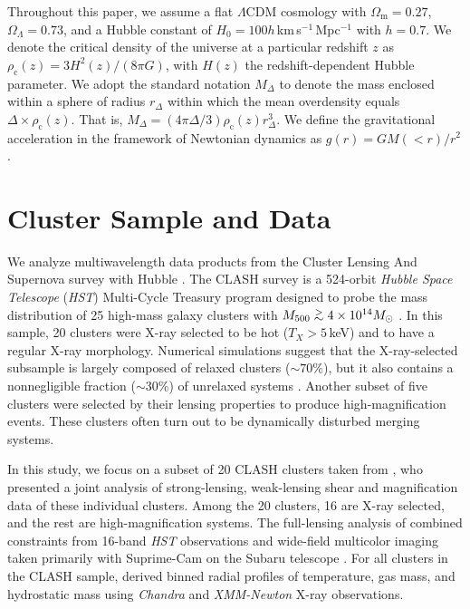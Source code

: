 \documentclass[a4paper,iop,twocolumn,twocolappendix,numberedappendix,appendixfloats]{emulateapj}
\newcommand{\percent}{\ensuremath{\%}}
\newcommand{\simgt}{\lower.5ex\hbox{$\; \buildrel > \over \sim \;$}}
\begin{document}
Throughout this paper, we assume a flat $\Lambda$CDM cosmology
with
$\Omega_\mathrm{m}=0.27$, $\Omega_\Lambda=0.73$, and a Hubble constant of
$H_0 = 100h$\,km\,s$^{-1}$\,Mpc$^{-1}$
with $h=0.7$.
We denote the critical density of the universe at a particular redshift
$z$ as $\rho_\mathrm{c}(z)=3H^2(z)/(8\pi G)$, with $H(z)$ the
redshift-dependent Hubble parameter.
We adopt the standard notation
$M_\Delta$
to denote the mass enclosed within a sphere of radius
$r_\Delta$
within which the mean overdensity equals
$\Delta \times \rho_\mathrm{c}(z)$. That is,
$M_\Delta=(4\pi\Delta/3)\rho_\mathrm{c}(z)r_\Delta^3$.
We define the gravitational acceleration
in the framework of Newtonian dynamics as $g(r)=GM(<r)/r^2$.

\section{Cluster Sample and Data}
\label{sec:data}

We analyze multiwavelength data products from the Cluster Lensing And
Supernova survey with Hubble \citep[CLASH;][]{Postman12}.
The CLASH survey is a 524-orbit {\em Hubble Space Telescope} ({\em HST})
Multi-Cycle Treasury program designed to probe the mass
distribution of 25 high-mass galaxy clusters with
$M_{500}\simgt 4\times 10^{14}M_\odot$ \citep{Umetsu16}.
In this sample, 20 clusters were X-ray selected to be hot ($T_X>5$\,keV)
and to have a regular X-ray morphology.
Numerical simulations
suggest that the X-ray-selected subsample is largely composed of
relaxed clusters ($\sim 70\percent$), but it also contains a nonnegligible
fraction ($\sim 30\percent$) of unrelaxed systems \citep{Meneghetti14}.
Another subset of five clusters were selected by their lensing
properties to produce high-magnification events.
These clusters often turn out to be dynamically disturbed merging
systems.

In this study, we focus on a subset of 20 CLASH clusters taken from
\citet{Umetsu16}, who presented a joint
analysis of strong-lensing, weak-lensing shear and magnification data of
these individual clusters.
Among the 20 clusters, 16 are X-ray selected, and the rest
are high-magnification systems.
The full-lensing analysis of \citet{Umetsu16} combined constraints from
16-band {\em HST}
observations \citep{Zitrin15} and wide-field multicolor imaging taken
primarily with Suprime-Cam on the Subaru telescope \citep{Umetsu14}.
For all clusters in the CLASH sample, \citet{Donahue14} derived binned
radial profiles of temperature, gas mass, and hydrostatic mass using
{\em Chandra} and {\em XMM-Newton} X-ray observations.
\end{document}
